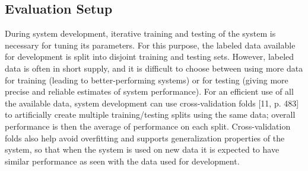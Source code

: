 \subsection{Evaluation Setup}
During system development, iterative training and testing of the system is necessary
for tuning its parameters. For this purpose, the labeled data available for development is split into disjoint training and testing sets. However, labeled data is often
in short supply, and it is difficult to choose between using more data for training
(leading to better-performing systems) or for testing (giving more precise and
reliable estimates of system performance). For an efficient use of all the available
data, system development can use cross-validation folds [11, p. 483] to artificially
create multiple training/testing splits using the same data; overall performance is
then the average of performance on each split. Cross-validation folds also help avoid
overfitting and supports generalization properties of the system, so that when the
system is used on new data it is expected to have similar performance as seen with
the data used for development.
